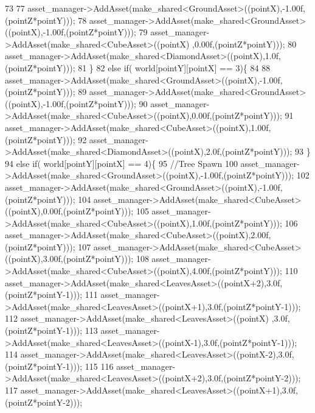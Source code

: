 \begin{DoxyCode}
73 
77             asset\_manager->AddAsset(make\_shared<GroundAsset>((pointX),-1.00f,(pointZ*pointY)));
78             asset\_manager->AddAsset(make\_shared<GroundAsset>((pointX),-1.00f,(pointZ*pointY)));
79             asset\_manager->AddAsset(make\_shared<CubeAsset>((pointX)  ,0.00f,(pointZ*pointY)));
80             asset\_manager->AddAsset(make\_shared<DiamondAsset>((pointX),1.0f,(pointZ*pointY)));
81    \}
82     \textcolor{keywordflow}{else} \textcolor{keywordflow}{if}( world[pointY][pointX] == 3)\{
84 
88             asset\_manager->AddAsset(make\_shared<GroundAsset>((pointX),-1.00f,(pointZ*pointY)));
89             asset\_manager->AddAsset(make\_shared<GroundAsset>((pointX),-1.00f,(pointZ*pointY)));
90             asset\_manager->AddAsset(make\_shared<CubeAsset>((pointX),0.00f,(pointZ*pointY)));
91             asset\_manager->AddAsset(make\_shared<CubeAsset>((pointX),1.00f,(pointZ*pointY)));
92             asset\_manager->AddAsset(make\_shared<DiamondAsset>((pointX),2.0f,(pointZ*pointY)));
93    \}
94     \textcolor{keywordflow}{else} \textcolor{keywordflow}{if}( world[pointY][pointX] == 4)\{
95             \textcolor{comment}{//Tree Spawn}
100 \textcolor{comment}{}            asset\_manager->AddAsset(make\_shared<GroundAsset>((pointX),-1.00f,(pointZ*pointY)));
102             asset\_manager->AddAsset(make\_shared<GroundAsset>((pointX),-1.00f,(pointZ*pointY)));
104             asset\_manager->AddAsset(make\_shared<CubeAsset>((pointX),0.00f,(pointZ*pointY)));
105             asset\_manager->AddAsset(make\_shared<CubeAsset>((pointX),1.00f,(pointZ*pointY)));
106             asset\_manager->AddAsset(make\_shared<CubeAsset>((pointX),2.00f,(pointZ*pointY)));
107             asset\_manager->AddAsset(make\_shared<CubeAsset>((pointX),3.00f,(pointZ*pointY)));
108             asset\_manager->AddAsset(make\_shared<CubeAsset>((pointX),4.00f,(pointZ*pointY)));
110             asset\_manager->AddAsset(make\_shared<LeavesAsset>((pointX+2),3.0f,(pointZ*pointY-1)));
111             asset\_manager->AddAsset(make\_shared<LeavesAsset>((pointX+1),3.0f,(pointZ*pointY-1)));
112             asset\_manager->AddAsset(make\_shared<LeavesAsset>((pointX)  ,3.0f,(pointZ*pointY-1)));
113             asset\_manager->AddAsset(make\_shared<LeavesAsset>((pointX-1),3.0f,(pointZ*pointY-1)));
114             asset\_manager->AddAsset(make\_shared<LeavesAsset>((pointX-2),3.0f,(pointZ*pointY-1)));
115 
116             asset\_manager->AddAsset(make\_shared<LeavesAsset>((pointX+2),3.0f,(pointZ*pointY-2)));
117             asset\_manager->AddAsset(make\_shared<LeavesAsset>((pointX+1),3.0f,(pointZ*pointY-2)));

\end{DoxyCode}
